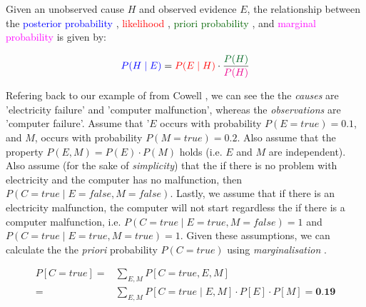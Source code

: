 \vspace{-5mm}

\begin{frm-thm}

\textup{Given an \textup{unobserved cause} $H$ and \textup{observed evidence} $E$, the relationship between the \textcolor{blue}{posterior probability} \footnotemark, \textcolor{red}{likelihood} \footnotemark, \textcolor{darkgreen}{priori probability} \footnotemark, and \textcolor{magenta}{marginal probability} \footnotemark is given by: }

\begin{gather*}
\textcolor{blue}{P(H \mid E)} = \textcolor{red}{P(E \mid H)} \cdot \frac{\textcolor{darkgreen}{P(H)}}{\textcolor{magenta}{P(H)}}
\end{gather*}


\end{frm-thm}



Refering back to our example of from Cowell \cite{cowell}, we can see the the \emph{causes} are 'electricity failure' and 'computer malfunction', whereas the \emph{observations} are 'computer failure'. Assume that '$E$ occurs with probability $P(E = true) = 0.1$, and $M$, occurs with probability $P(M = true) = 0.2$. Also assume that the property $P(E, M) = P(E) \cdot P(M)$ holds (i.e. $E$ and $M$ are independent).  Also assume (for the sake of \emph{simplicity}) that the if there is no problem with electricity and the computer has no malfunction, then $P(C = true \mid E = false, M = false)$. Lastly, we assume that if there is an electricity malfunction, the computer will not start regardless the if there is a computer malfunction, i.e. $P(C = true \mid E = true, M = false) = 1$ and $P(C = true \mid E = true, M = true) = 1$. Given these assumptions, we can calculate the the \emph{priori} probability $P(C = true)$ using \emph{marginalisation} \cite{barberBRML2011}.

\begin{equation*}
\begin{aligned}
P[C = true] ={} & \sum_{E, M}^{} P[C = true, E, M] \\
				  ={} & \sum_{E, M}^{} P[C = true \mid E, M] \cdot P[E] \cdot P[M] = \textbf{0.19}
\end{aligned}
\end{equation*}

